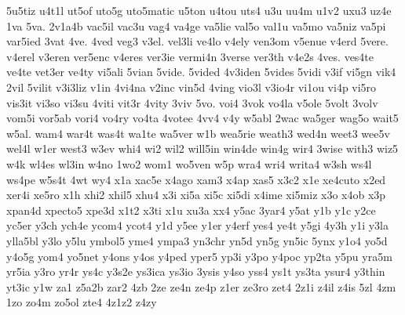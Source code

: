 {5u5tiz
u4t1l
ut5of
uto5g
uto5matic
u5ton
u4tou
uts4
u3u
uu4m
u1v2
uxu3
uz4e
1va
5va.
2v1a4b
vac5il
vac3u
vag4
va4ge
va5lie
val5o
val1u
va5mo
va5niz
va5pi
var5ied
3vat
4ve.
4ved
veg3
v3el.
vel3li
ve4lo
v4ely
ven3om
v5enue
v4erd
5vere.
v4erel
v3eren
ver5enc
v4eres
ver3ie
vermi4n
3verse
ver3th
v4e2s
4ves.
ves4te
ve4te
vet3er
ve4ty
vi5ali
5vian
5vide.
5vided
4v3iden
5vides
5vidi
v3if
vi5gn
vik4
2vil
5vilit
v3i3liz
v1in
4vi4na
v2inc
vin5d
4ving
vio3l
v3io4r
vi1ou
vi4p
vi5ro
vis3it
vi3so
vi3su
4viti
vit3r
4vity
3viv
5vo.
voi4
3vok
vo4la
v5ole
5volt
3volv
vom5i
vor5ab
vori4
vo4ry
vo4ta
4votee
4vv4
v4y
w5abl
2wac
wa5ger
wag5o
wait5
w5al.
wam4
war4t
was4t
wa1te
wa5ver
w1b
wea5rie
weath3
wed4n
weet3
wee5v
wel4l
w1er
west3
w3ev
whi4
wi2
wil2
will5in
win4de
win4g
wir4
3wise
with3
wiz5
w4k
wl4es
wl3in
w4no
1wo2
wom1
wo5ven
w5p
wra4
wri4
writa4
w3sh
ws4l
ws4pe
w5s4t
4wt
wy4
x1a
xac5e
x4ago
xam3
x4ap
xas5
x3c2
x1e
xe4cuto
x2ed
xer4i
xe5ro
x1h
xhi2
xhil5
xhu4
x3i
xi5a
xi5c
xi5di
x4ime
xi5miz
x3o
x4ob
x3p
xpan4d
xpecto5
xpe3d
x1t2
x3ti
x1u
xu3a
xx4
y5ac
3yar4
y5at
y1b
y1c
y2ce
yc5er
y3ch
ych4e
ycom4
ycot4
y1d
y5ee
y1er
y4erf
yes4
ye4t
y5gi
4y3h
y1i
y3la
ylla5bl
y3lo
y5lu
ymbol5
yme4
ympa3
yn3chr
yn5d
yn5g
yn5ic
5ynx
y1o4
yo5d
y4o5g
yom4
yo5net
y4ons
y4os
y4ped
yper5
yp3i
y3po
y4poc
yp2ta
y5pu
yra5m
yr5ia
y3ro
yr4r
ys4c
y3s2e
ys3ica
ys3io
3ysis
y4so
yss4
ys1t
ys3ta
ysur4
y3thin
yt3ic
y1w
za1
z5a2b
zar2
4zb
2ze
ze4n
ze4p
z1er
ze3ro
zet4
2z1i
z4il
z4is
5zl
4zm
1zo
zo4m
zo5ol
zte4
4z1z2
z4zy
}